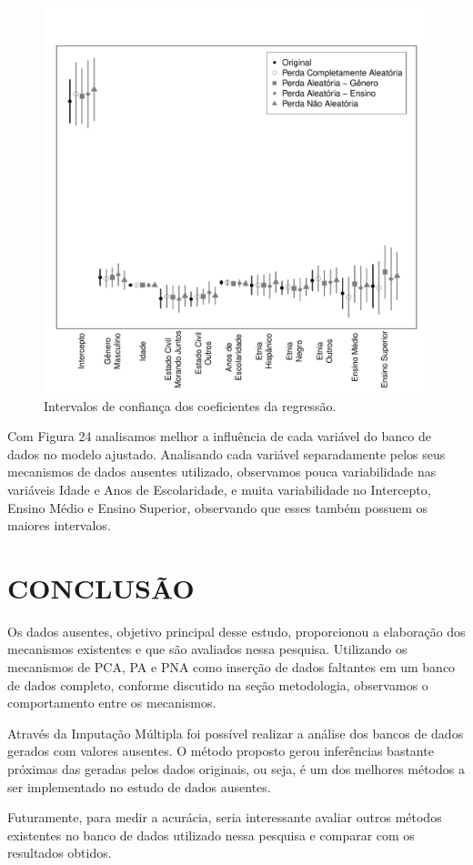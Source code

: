 \documentclass[]{article}
\begin{document}
\begin{figure}[H]

{\centering \includegraphics[width=0.6\linewidth]{reg-graf} 

}

\caption{Intervalos de confiança dos coeficientes da regressão.}\label{fig:unnamed-chunk-33}
\end{figure}

Com Figura 24 analisamos melhor a influência de cada variável do banco
de dados no modelo ajustado. Analisando cada variável separadamente
pelos seus mecanismos de dados ausentes utilizado, observamos pouca
variabilidade nas variáveis Idade e Anos de Escolaridade, e muita
variabilidade no Intercepto, Ensino Médio e Ensino Superior, observando
que esses também possuem os maiores intervalos.

\section{CONCLUSÃO}\label{conclusao}

Os dados ausentes, objetivo principal desse estudo, proporcionou a
elaboração dos mecanismos existentes e que são avaliados nessa pesquisa.
Utilizando os mecanismos de PCA, PA e PNA como inserção de dados
faltantes em um banco de dados completo, conforme discutido na seção
metodologia, observamos o comportamento entre os mecanismos.

Através da Imputação Múltipla foi possível realizar a análise dos bancos
de dados gerados com valores ausentes. O método proposto gerou
inferências bastante próximas das geradas pelos dados originais, ou
seja, é um dos melhores métodos a ser implementado no estudo de dados
ausentes.

Futuramente, para medir a acurácia, seria interessante avaliar outros
métodos existentes no banco de dados utilizado nessa pesquisa e comparar
com os resultados obtidos.
\end{document}
